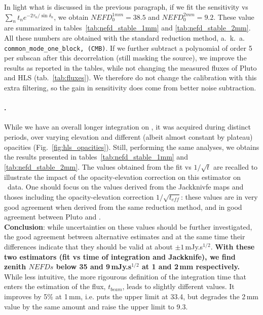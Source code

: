 In light what is discussed in the previous paragraph, if we fit the sensitivity
vs $\sum_{n}t_n e^{-2\tau_n/\sin\delta_n}$, we obtain $NEFD_0^{1mm} = 38.5$ and
$NEFD_0^{2mm}=9.2$. These value are summarized in
tables~\ref{tab:nefd_stable_1mm} and \ref{tab:nefd_stable_2mm}. All these
numbers are obtained with the standard reduction method, a.~k.~a. {\tt
  common\_mode\_one\_block, (CMB)}. If we further subtract a polynomial of order
5 per subscan after this decorrelation (still masking the source), we improve
the results as reported in the tables, while not changing the measured fluxes of
Pluto and HLS (tab.~\ref{tab:fluxes}). We therefore do not change the
calibration with this extra filtering, so the gain in sensitivity does come from
better noise subtraction.

\paragraph{\hls.} While we have an overall
longer integration on \hls, it was acquired during distinct periods, over
varying elevation and different (albeit almost constant by plateau)
opacities (Fig.~\ref{fig:hls_opacities}). Still, performing the same analyses, we obtains the results presented
in tables~\ref{tab:nefd_stable_1mm} and \ref{tab:nefd_stable_2mm}. The values
obtained from the fit vs $1/\sqrt{t}$ are recalled to illustrate the impact of
the opacity-elevation correction on this estimator on \hls\ data. One should
focus on the values derived from the Jackknivfe maps and thoses including the
opacity-elevation correction $1/\sqrt{t_{eff}}$: these values are in very good
agreement when derived from the same reduction method, and in good agreement
between Pluto and \hls.\\

{\bf Conclusion}: while uncertainties on these values should be further
investigated, the good agreement between alternative estimates and at the same
time their differences indicate that they should be valid at about $\pm 1$\,mJy.s$^{1/2}$.
{\bf With these two estimators (fit vs time of integration and
  Jackknife), we find zenith $NEFDs$ below 35 and 9\,mJy.s$^{1/2}$ at 1 and
  2\,mm respectively.} While less intuitive, the more rigourous definition of
the integration time that enters the estimation of the flux, $t_{beam}$, leads to
  slightly different values. It improves by 5\% at 1\,mm, i.e. puts the upper limit at 33.4, but
  degrades the 2\,mm value by the same amount and raise the upper limit to 9.3.

